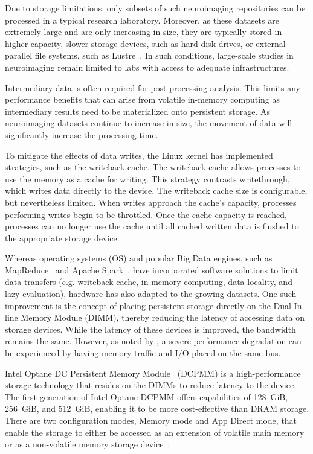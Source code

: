 Due to storage limitations, only subsets of such neuroimaging repositories can
be processed in a typical research laboratory. Moreover, as these datasets are
extremely large and are only increasing in size, they are typically stored in
higher-capacity, slower storage devices, such as hard disk drives, or external
parallel file systems, such as Lustre~\cite{lustre}. In such conditions,
large-scale studies in neuroimaging remain limited to labs with access to
adequate infrastructures.

Intermediary data is often required for post-processing analysis. This limits
any performance benefits that can arise from volatile in-memory computing as
intermediary results need to be materialized onto persistent storage. As
neuroimaging datasets continue to increase in size, the movement of data will
significantly increase the processing time.

To mitigate the effects of data writes, the Linux kernel has implemented
strategies, such as the writeback cache. The writeback cache allows processes to
use the memory as a cache for writing. This strategy contrasts writethrough,
which writes data directly to the device. The writeback cache size is
configurable, but nevertheless limited. When writes approach the cache's
capacity, processes performing writes begin to be throttled. Once the cache
capacity is reached, processes can no longer use the cache until all cached
written data is flushed to the appropriate storage device.

Whereas operating systems (OS) and popular Big Data engines, such as
MapReduce~\cite{dean2008mapreduce} and Apache Spark~\cite{zaharia2016apache},
have incorporated software solutions to limit data transfers (e.g. writeback
cache, in-memory computing, data locality, and lazy evaluation), hardware has
also adapted to the growing datasets. One such improvement is the concept of
placing persistent storage directly on the Dual In-line Memory Module (DIMM),
thereby reducing the latency of accessing data on storage devices. While the
latency of these devices is improved, the bandwidth remains the same. However,
as noted by \cite{nvdimms}, a severe performance degradation can be experienced
by having memory traffic and I/O placed on the same bus.


Intel Optane DC Persistent Memory Module~\cite{optanebrief} (DCPMM) is a
high-performance storage technology that resides on the DIMMs to reduce latency
to the device. The first generation of Intel Optane DCPMM offers capabilities of
128~GiB, 256~GiB, and 512~GiB, enabling it to be more cost-effective than DRAM
storage. There are two configuration modes, Memory mode and App Direct mode,
that enable the storage to either be accessed as an extension of volatile main
memory or as a non-volatile memory storage device~\cite{memory-modes}.



